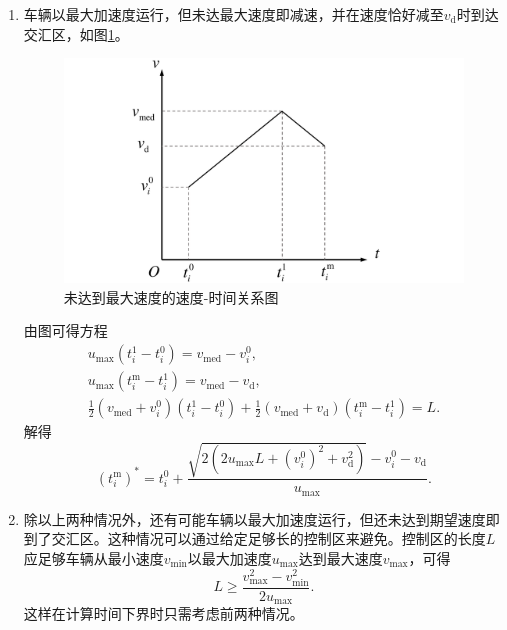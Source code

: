 \begin{enumerate}[label=(\arabic*), wide=\parindent]
\item 车辆以最大加速度运行，但未达最大速度即减速，并在速度恰好减至$v_\mathrm{d}$时到达交汇区，如图\ref{fig:vmed}。
\begin{figure}[htbp]
\centering
\includegraphics[width=12cm]{figures/vmed.pdf}
\caption{未达到最大速度的速度-时间关系图}
\label{fig:vmed}
\end{figure}

由图可得方程
\begin{gather}
u_{\max}(t_i^1-t_i^0)=v_\mathrm{med}-v_i^0,\\
u_{\max}(t_i^\mathrm{m}-t_i^1)=v_\mathrm{med}-v_\mathrm{d},\\
\frac12(v_\mathrm{med}+v_i^0)(t_i^1-t_i^0) + \frac12(v_\mathrm{med}+v_\mathrm{d})(t_i^\mathrm{m}-t_i^1) = L.
\end{gather}
解得
\begin{equation}
(t_i^\mathrm{m})^*=t_i^0+\frac{\sqrt{2(2u_{\max}L+(v_i^0)^2+v_\mathrm{d}^2)}-v_i^0-v_\mathrm{d}}{u_{\max}}.
\end{equation}
\item 除以上两种情况外，还有可能车辆以最大加速度运行，但还未达到期望速度即到了交汇区。这种情况可以通过给定足够长的控制区来避免。控制区的长度$L$应足够车辆从最小速度$v_{\min}$以最大加速度$u_{\max}$达到最大速度$v_{\max}$，可得
\begin{equation}
L\geq \frac{v_{\max}^2-v_{\min}^2}{2u_{\max}}.
\end{equation}
这样在计算时间下界时只需考虑前两种情况。
\end{enumerate}

